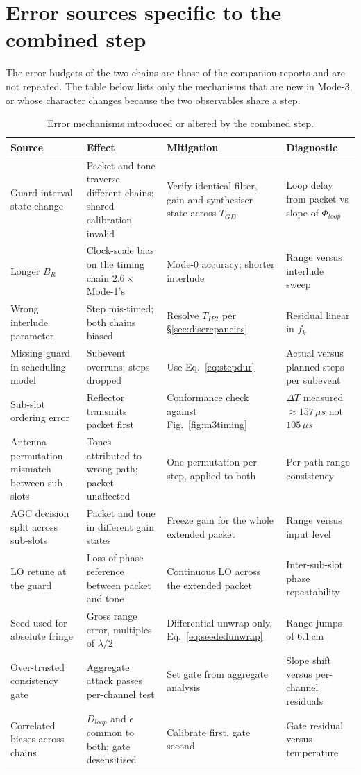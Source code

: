 \documentclass[11pt,a4paper]{article}
\newcommand{\us}{\,\ensuremath{\upmu}s}
\newcommand{\Tgd}{T_{GD}}
\newcommand{\Tipthree}{T_{IP2}}
\providecommand{\upmu}{\mu}
\begin{document}
\section{Error sources specific to the combined step}

The error budgets of the two chains are those of the companion reports and are not repeated. The
table below lists only the mechanisms that are new in Mode-3, or whose character changes because the
two observables share a step.

\begin{table}[h]
\caption{Error mechanisms introduced or altered by the combined step.}
\label{tab:errors}
\centering\small
\begin{tabular}{@{}L{30mm}L{34mm}L{34mm}L{30mm}@{}}
\toprule
Source & Effect & Mitigation & Diagnostic \\
\midrule
Guard-interval state change & Packet and tone traverse different chains; shared calibration invalid & Verify identical filter, gain and synthesiser state across $\Tgd$ & Loop delay from packet vs slope of $\Phi_{loop}$ \\
Longer $B_R$ & Clock-scale bias on the timing chain $2.6\times$ Mode-1's & Mode-0 accuracy; shorter interlude & Range versus interlude sweep \\
Wrong interlude parameter & Step mis-timed; both chains biased & Resolve $\Tipthree$ per \S\ref{sec:discrepancies} & Residual linear in $f_k$ \\
Missing guard in scheduling model & Subevent overruns; steps dropped & Use Eq.~\eqref{eq:stepdur} & Actual versus planned steps per subevent \\
Sub-slot ordering error & Reflector transmits packet first & Conformance check against Fig.~\ref{fig:m3timing} & $\Delta T$ measured $\approx157\us$ not $105\us$ \\
Antenna permutation mismatch between sub-slots & Tones attributed to wrong path; packet unaffected & One permutation per step, applied to both & Per-path range consistency \\
AGC decision split across sub-slots & Packet and tone in different gain states & Freeze gain for the whole extended packet & Range versus input level \\
LO retune at the guard & Loss of phase reference between packet and tone & Continuous LO across the extended packet & Inter-sub-slot phase repeatability \\
Seed used for absolute fringe & Gross range error, multiples of $\lambda/2$ & Differential unwrap only, Eq.~\eqref{eq:seededunwrap} & Range jumps of $6.1$\,cm \\
Over-trusted consistency gate & Aggregate attack passes per-channel test & Set gate from aggregate analysis & Slope shift versus per-channel residuals \\
Correlated biases across chains & $D_{loop}$ and $\epsilon$ common to both; gate desensitised & Calibrate first, gate second & Gate residual versus temperature \\
\bottomrule
\end{tabular}
\end{table}
\end{document}
